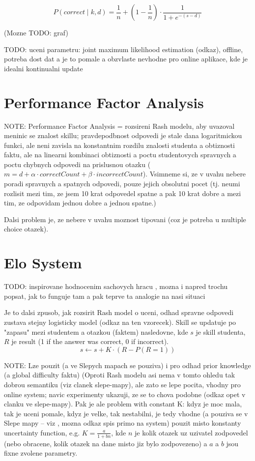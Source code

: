 \documentclass[a4paper, 12pt, twoside]{fithesis2}		%
\renewcommand{\_}{\leavevmode \kern0.0em\vbox{\hrule width0.4em}}
\newcounter{choice}
\begin{document}
$$
P(correct \mid k, d) = \frac{1}{n} + \left( 1 - \frac{1}{n} \right) \cdot \frac{1}{1 + e^{-(s - d)}}
$$

(Mozne TODO: graf)

TODO: uceni parametru: joint maximum likelihood estimation (odkaz), offline, potreba dost dat a je to pomale a obzvlaste nevhodne pro online aplikace, kde je idealni kontinualni update


\section{Performance Factor Analysis}
\label{sec:pfa}

NOTE: Performance Factor Analysis = rozsireni Rash modelu, aby uvazoval meninic se znalost skillu; pravdepodbnost odpovedi je stale dana logaritmickou funkci, ale neni zavisla na konstantnim rozdilu znalosti studenta a obtiznosti faktu, ale na linearni kombinaci obtiznosti a poctu studentovych spravnych a poctu chybnych odpovedi na prislusnou otazku ($m = d + \alpha \cdot correctCount + \beta \cdot incorrectCount$).
Vsimneme si, ze v uvahu nebere poradi spravnych a spatnych odpovedi, pouze jejich obsolutni pocet (tj. neumi rozlisit mezi tim, ze jsem 10 krat odpovedel spatne a pak 10 krat dobre a mezi tim, ze odpovidam jednou dobre a jednou spatne.)

Dalsi problem je, ze nebere v uvahu moznost tipovani (coz je potreba u multiple choice otazek).

\section{Elo System}
\label{sec:elo}


TODO: inspirovane hodnocenim sachovych hracu \cite{elo-rating}, mozna i napred trochu popsat, jak to funguje tam a pak teprve ta analogie na nasi situaci

Je to dalsi zpusob, jak rozsirit Rash model o uceni, odhad spravne odpovedi zustava stejny logisticky model (odkaz na ten vzorecek). Skill se updatuje po "zapasu" mezi studentem a otazkou (faktem) nasledovne,
kde $s$ je skill studenta, $R$ je result (1 if the answer was correct, 0 if incorrect).
$$
s \gets s + K \cdot (R - P(R = 1))
$$

NOTE: Lze pouzit (a ve Slepych mapach \cite{slepe-mapy} se pouziva) i pro odhad prior knowledge (a global difficulty faktu)
(Oproti Rash modelu asi nema v tomto ohledu tak dobrou semantiku (viz clanek slepe-mapy), ale zato se lepe pocita, vhodny pro online system; navic experimenty ukazuji, ze se to chova podobne (odkaz opet v clanku ve slepe-mapy).
Pak je ale problem with constant K: kdyz je moc mala, tak je uceni pomale, kdyz je velke, tak nestabilni, je tedy vhodne (a pouziva se v Slepe mapy -- viz \cite{slepe-mapy}, mozna odkaz spis primo na system) pouzit misto konstanty
uncertainty function, e.g. $K = \frac{a}{1 + bn}$, kde $n$ je kolik otazek uz uzivatel zodpovedel (nebo obracene, kolik otazek na dane misto jiz bylo zodpovezeno) a $a$ a $b$ jsou fixne zvolene parametry.
\end{document}
